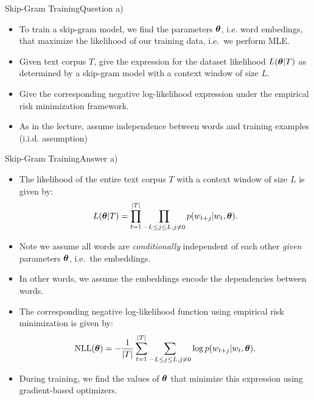 \documentclass[t]{beamer}
\begin{document}
\begin{frame}{Skip-Gram Training}{Question a)}
    \begin{itemize}
        \item To train a skip-gram model, we find the parameters ${\boldsymbol{\theta}}$, i.e.
              word embedings, that maximize the likelihood of our training data,
              i.e.\ we perform MLE.
        \item Given text corpus $T$, give the expression for the dataset
              likelihood $L({\boldsymbol{\theta}}|T)$ as determined by a skip-gram model with
              a context window of size $L$.
        \item Give the corresponding negative log-likelihood expression under
              the empirical risk minimization framework.
        \item As in the lecture, assume independence between words and training
              examples (i.i.d. assumption)
    \end{itemize}
\end{frame}

\begin{frame}{Skip-Gram Training}{Answer a)}
    \begin{itemize}
        \item The likelihood of the entire text corpus $T$ with a context window
              of size $L$ is given by:
              \begin{align*}
                  L({\boldsymbol{\theta}}|T) = \prod_{t=1}^{|T|}\prod_{-L\leq j\leq L, j\neq 0} p(w_{t+j}|w_t,{\boldsymbol{\theta}}).
              \end{align*}
        \item Note we assume all words are \emph{conditionally}
              independent of each other \emph{given} parameters ${\boldsymbol{\theta}}$, i.e.\
              the embeddings.
        \item In other words, we assume the embeddings encode the dependencies
              between words.
        \item The corresponding negative log-likelihood function using empirical
              risk minimization is given by:
              \begin{align*}
                  \text{NLL}({\boldsymbol{\theta}}) = - \frac{1}{|T|} \sum_{t=1}^{|T|} \sum_{-L\leq j\leq L, j\neq 0} \log p(w_{t+j}|w_t,{\boldsymbol{\theta}}).
              \end{align*}
        \item During training, we find the values of ${\boldsymbol{\theta}}$ that minimize
              this expression using gradient-based optimizers.
    \end{itemize}
\end{frame}
\end{document}
